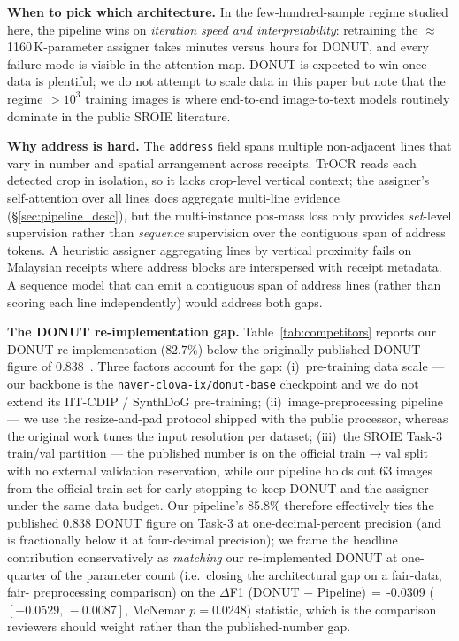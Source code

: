 \documentclass[conference]{IEEEtran}
\begin{document}
\textbf{When to pick which architecture.}
In the few-hundred-sample regime studied here, the pipeline wins on
\emph{iteration speed and interpretability}: retraining the
$\approx$1160\,K-parameter assigner takes minutes
versus hours for DONUT, and every failure mode is visible in the
attention map.  DONUT is expected to win once data is plentiful; we
do not attempt to scale data in this paper but note that the regime
$>10^3$ training images is where end-to-end image-to-text models
routinely dominate in the public SROIE literature.

\textbf{Why address is hard.}
The \texttt{address} field spans multiple non-adjacent lines that
vary in number and spatial arrangement across receipts.  TrOCR reads
each detected crop in isolation, so it lacks crop-level vertical
context; the assigner's self-attention over all lines does aggregate
multi-line evidence (\S\ref{sec:pipeline_desc}), but the
multi-instance pos-mass loss only provides \emph{set}-level
supervision rather than \emph{sequence} supervision over the
contiguous span of address tokens.  A heuristic assigner aggregating
lines by vertical proximity fails on Malaysian receipts where address
blocks are interspersed with receipt metadata.  A sequence model that
can emit a contiguous span of address lines (rather than scoring
each line independently) would address both gaps.

\textbf{The DONUT re-implementation gap.}
Table~\ref{tab:competitors} reports our DONUT re-implementation
($82.7\%$) below the originally published DONUT figure
of $0.838$~\cite{kim2022donut}.  Three factors account for the gap:
(i)~pre-training data scale --- our backbone is the
\texttt{naver-clova-ix/donut-base} checkpoint and we do not extend
its IIT-CDIP / SynthDoG pre-training; (ii)~image-preprocessing
pipeline --- we use the resize-and-pad protocol shipped with the
public processor, whereas the original work tunes the input
resolution per dataset; (iii)~the SROIE Task-3 train/val partition
--- the published number is on the official train$\rightarrow$val
split with no external validation reservation, while our pipeline
holds out $63$ images from the official train set for early-stopping
to keep DONUT and the assigner under the same data budget.  Our
pipeline's 85.8\% therefore effectively ties the
published $0.838$ DONUT figure on Task-3 at one-decimal-percent
precision (and is fractionally below it at four-decimal precision);
we frame the headline contribution conservatively as \emph{matching}
our re-implemented DONUT at one-quarter of the
parameter count
(i.e.\ closing the architectural gap on a fair-data, fair-
preprocessing comparison) on the
$\Delta$F1 (DONUT $-$ Pipeline)$\,=\,$-0.0309
($[-0.0529,\,-0.0087]$, McNemar
$p=$0.0248) statistic, which is the comparison reviewers
should weight rather than the published-number gap.
\end{document}
